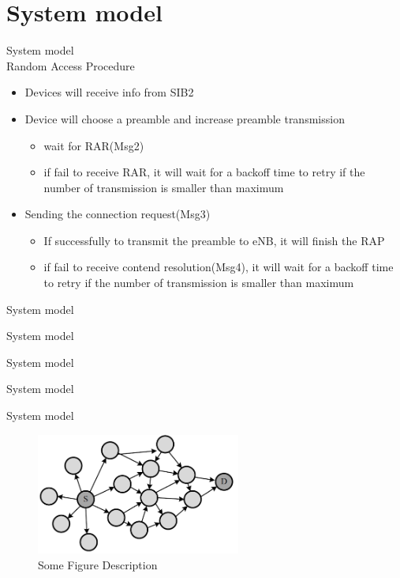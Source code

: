 \documentclass{beamer}
\begin{document}
\section{System model}
\begin{frame}{{System model}\\Random Access Procedure}
    \begin{itemize}
        \item{Devices will receive info from SIB2}
        \item{Device will choose a preamble and increase preamble transmission}
        \begin{itemize}
            \item wait for RAR(Msg2)
            \item if fail to receive RAR, it will wait for a backoff time to retry if the number of transmission is smaller than maximum
        \end{itemize}
        \item{Sending the connection request(Msg3)}
        \begin{itemize}
            \item{If successfully to transmit the preamble to eNB, it will finish the RAP}
            \item if fail to receive contend resolution(Msg4), it will wait for a backoff time to retry if the number of transmission is smaller than maximum
        \end{itemize}
    \end{itemize}
\end{frame}

\begin{frame}{System model}
    
\end{frame}
\begin{frame}{System model}
    
\end{frame}
\begin{frame}{System model}
    
\end{frame}
\begin{frame}{System model}
    
\end{frame}

\begin{frame}{System model}
    \begin{figure}[t]
        \centering
        \includegraphics[width=0.6\textwidth]{figures/Fig_1-1.png}
        \caption{Some Figure Description}
    \end{figure}
\end{frame}
\end{document}
